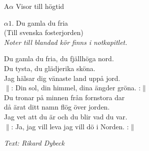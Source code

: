\documentclass[a6paper,10pt]{article}
\newcommand{\auth}[1]{\begin{flushright}\textit{#1}\end{flushright}}
\newcommand{\songtitle}[2]{\Large{#1. #2}\\}
\newcommand{\songsubtitle}[1]{\large{#1}\\}
\newcommand{\sheetmusicnotice}[1]{\small{\textit{#1}}}
\newenvironment{lyrics}{}{} %
\begin{document}
\noindent
\huge{A$\alpha$ Visor till högtid}
\begin{center}
\songtitle{$\alpha1$}{Du gamla du fria}
\songsubtitle{(Till svenska fosterjorden)}
\sheetmusicnotice{Noter till blandad kör finns i notkapitlet.}
\end{center}
\small\begin{lyrics}
Du gamla du fria, du fjällhöga nord. \\
Du tysta, du glädjerika sköna. \\
Jag hälsar dig vänaste land uppå jord.\\
$\|$: Din sol, din himmel, dina ängder gröna. :$\|$\\
\newline
Du tronar på minnen från fornstora dar\\
då ärat ditt namn flög över jorden.\\
Jag vet att du är och du blir vad du var.\\
$\|$: Ja, jag vill leva jag vill dö i Norden. :$\|$\\
\end{lyrics}
\auth{Text: Rikard Dybeck}
\end{document}
